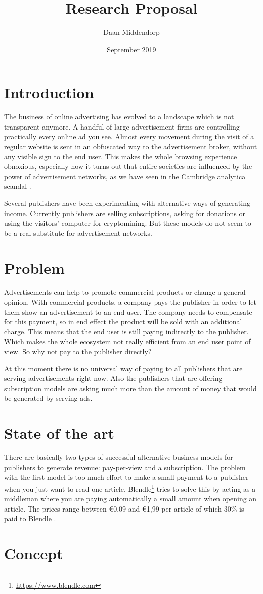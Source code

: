\documentclass[]{article}
\title{Research Proposal}
\author{Daan Middendorp}
\date{September 2019}
\begin{document}
\maketitle

\section{Introduction}
The business of online advertising has evolved to a landscape which is not transparent anymore. A handful of large advertisement firms are controlling practically every online ad you see. Almost every movement during the visit of a regular website is sent in an obfuscated way to the advertisement broker, without any visible sign to the end user. This makes the whole browsing experience obnoxious, especially now it turns out that entire societies are influenced by the power of advertisement networks, as we have seen in the Cambridge analytica scandal .

Several publishers have been experimenting with alternative ways of generating income. Currently publishers are selling subscriptions, asking for donations or using the visitors' computer for cryptomining. But these models do not seem to be a real substitute for advertisement networks.

\section{Problem}
Advertisements can help to promote commercial products or change a general opinion. With commercial products, a company pays the publisher in order to let them show an advertisement to an end user. The company needs to compensate for this payment, so in end effect the product will be sold with an additional charge. This means that the end user is still paying indirectly to the publisher. Which makes the whole ecosystem not really efficient from an end user point of view. So why not pay to the publisher directly?

At this moment there is no universal way of paying to all publishers that are serving advertisements right now. Also the publishers that are offering subscription models are asking much more than the amount of money that would be generated by serving ads.

\section{State of the art}
There are basically two types of successful alternative business models for publishers to generate revenue: pay-per-view and a subscription. The problem with the first model is too much effort to make a small payment to a publisher when you just want to read one article. Blendle\footnote{\url{https://www.blendle.com}} tries to solve this by acting as a middleman where you are paying automatically a small amount when opening an article. The prices range between €0,09 and €1,99 per article of which 30\% is paid to Blendle .

\section {Concept}
\end{document}
